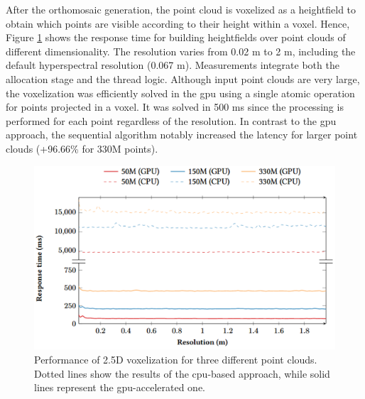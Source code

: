 After the orthomosaic generation, the point cloud is voxelized as a heightfield to obtain which points are visible according to their height within a voxel. Hence, Figure \ref{fig:hyper_voxelization_results} shows the response time for building heightfields over point clouds of different dimensionality. The resolution varies from 0.02 \si{\meter} to 2 \si{\meter}, including the default hyperspectral resolution (0.067 \si{\meter}). Measurements integrate both the allocation stage and the thread logic. Although input point clouds are very large, the voxelization was efficiently solved in the \acrshort{gpu} using a single atomic operation for points projected in a voxel. It was solved in 500 \si{\milli\second} since the processing is performed for each point regardless of the resolution. In contrast to the \acrshort{gpu} approach, the sequential algorithm notably increased the latency for larger point clouds (+96.66\% for 330M points).

\begin{figure}[bt]
    \centering
    \includegraphics[width=\linewidth]{figs/hyper_point_cloud/voxelization_results.png}
	\caption{Performance of 2.5D voxelization for three different point clouds. Dotted lines show the results of the \acrshort{cpu}-based approach, while solid lines represent the \acrshort{gpu}-accelerated one. }
	\label{fig:hyper_voxelization_results}
\end{figure}


